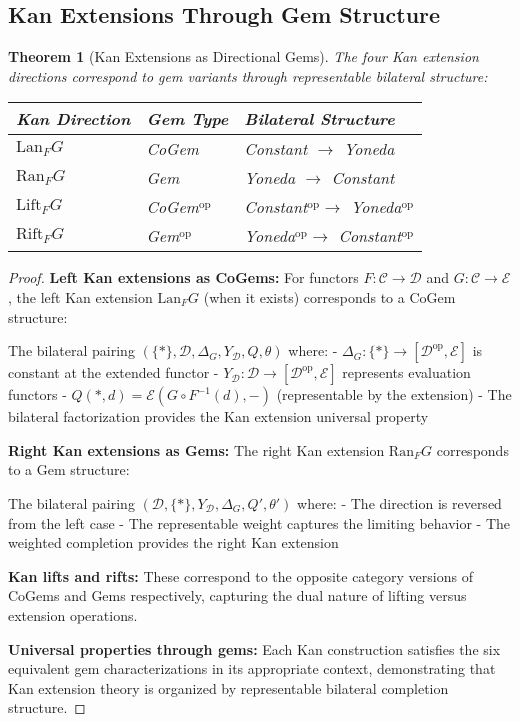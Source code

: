 \documentclass[11pt]{article}
\theoremstyle{plain}
\newtheorem{theorem}{Theorem}[section]
\theoremstyle{definition}
\theoremstyle{remark}
\newcommand{\C}{\mathcal{C}}
\newcommand{\D}{\mathcal{D}}
\newcommand{\E}{\mathcal{E}}
\newcommand{\op}{\mathrm{op}}
\begin{document}
\subsection{Kan Extensions Through Gem Structure}

\begin{theorem}[Kan Extensions as Directional Gems]\label{thm:kan-extensions-gems}
The four Kan extension directions correspond to gem variants through representable bilateral structure:

\begin{center}
\begin{tabular}{|l|l|l|}
\hline
\textbf{Kan Direction} & \textbf{Gem Type} & \textbf{Bilateral Structure} \\
\hline
$\text{Lan}_F G$ & CoGem & Constant $\to$ Yoneda \\
$\text{Ran}_F G$ & Gem & Yoneda $\to$ Constant \\
$\text{Lift}_F G$ & CoGem$^{\op}$ & Constant$^{\op} \to$ Yoneda$^{\op}$ \\
$\text{Rift}_F G$ & Gem$^{\op}$ & Yoneda$^{\op} \to$ Constant$^{\op}$ \\
\hline
\end{tabular}
\end{center}
\end{theorem}

\begin{proof}
\textbf{Left Kan extensions as CoGems:}
For functors $F : \C \to \D$ and $G : \C \to \E$, the left Kan extension $\text{Lan}_F G$ (when it exists) corresponds to a CoGem structure:

The bilateral pairing $(\{\ast\}, \D, \Delta_G, Y_\D, Q, \theta)$ where:
- $\Delta_G : \{\ast\} \to [\D^{\op}, \E]$ is constant at the extended functor
- $Y_\D : \D \to [\D^{\op}, \E]$ represents evaluation functors
- $Q(\ast, d) = \E(G \circ F^{-1}(d), -)$ (representable by the extension)
- The bilateral factorization provides the Kan extension universal property

\textbf{Right Kan extensions as Gems:}
The right Kan extension $\text{Ran}_F G$ corresponds to a Gem structure:

The bilateral pairing $(\D, \{\ast\}, Y_\D, \Delta_G, Q', \theta')$ where:
- The direction is reversed from the left case
- The representable weight captures the limiting behavior
- The weighted completion provides the right Kan extension

\textbf{Kan lifts and rifts:}
These correspond to the opposite category versions of CoGems and Gems respectively, capturing the dual nature of lifting versus extension operations.

\textbf{Universal properties through gems:}
Each Kan construction satisfies the six equivalent gem characterizations in its appropriate context, demonstrating that Kan extension theory is organized by representable bilateral completion structure.
\end{proof}
\end{document}
